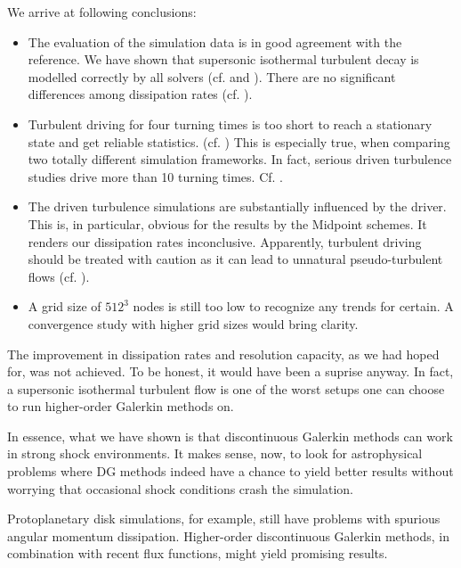 We arrive at following conclusions:
\begin{itemize}
\item The evaluation of the simulation data is in good agreement with the
reference. We have shown that supersonic isothermal turbulent decay is modelled
correctly by all solvers (cf.  and
). There are no significant differences among dissipation
rates (cf. ).

\item Turbulent driving for four turning times is too short to reach a
stationary state and get reliable statistics. (cf.
) This is especially true, when
comparing two totally different simulation frameworks. In fact, serious driven
turbulence studies drive more than 10 turning times. Cf. \cite{konstandin2016mach}.

\item The driven turbulence simulations are substantially influenced by the
driver. This is, in particular, obvious for the results by the Midpoint
schemes. It renders our dissipation rates inconclusive. Apparently, turbulent
driving should be treated with caution as it can lead to unnatural
pseudo-turbulent flows (cf. ).

\item A grid size of $512^3$ nodes is still too low to recognize any trends for
certain. A convergence study with higher grid sizes would bring clarity.
\end{itemize}

The improvement in dissipation rates and resolution capacity, as we had hoped
for, was not achieved. To be honest, it would have been a suprise anyway. In
fact, a supersonic isothermal turbulent flow is one of the worst setups one can
choose to run higher-order Galerkin methods on. 


In essence, what we have shown is that discontinuous Galerkin methods can work
in strong shock environments. It makes sense, now, to look for astrophysical
problems where DG methods indeed have a chance to yield better results
without worrying that occasional shock conditions crash the simulation.

Protoplanetary disk simulations, for example, still have problems with
spurious angular momentum dissipation. Higher-order discontinuous
Galerkin methods, in combination with recent flux functions, might yield
promising results.

\newpage
